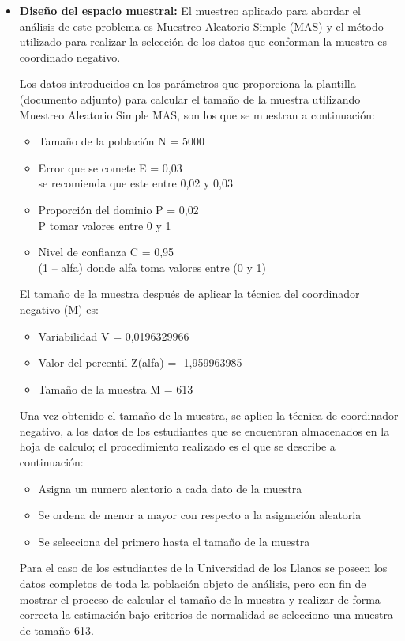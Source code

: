\begin{itemize}
  	\item \textbf {Diseño del espacio muestral:}
	El muestreo aplicado para abordar el análisis de este problema es Muestreo Aleatorio Simple (MAS) y el método utilizado para realizar la selección de los datos que conforman la muestra es coordinado negativo.
	
		
	\bigskip
	Los datos introducidos en los parámetros que proporciona la plantilla (documento adjunto) para calcular el tamaño de la muestra utilizando Muestreo Aleatorio Simple MAS, son los que se muestran a continuación:\\
	
	\begin{itemize}
		\item Tamaño de la población 	N = 5000	
		\item Error que se comete		E = 0,03	\\se recomienda que este entre 0,02 y 0,03
		\item Proporción del dominio	P = 0,02	\\P tomar valores entre 0 y 1
		\item Nivel de confianza		C = 0,95	\\(1 – alfa) donde alfa toma valores entre (0 y 1)
	\end{itemize}
	\bigskip
  	  	El tamaño de la muestra después de aplicar la técnica del coordinador negativo (M) es:
  	\bigskip  	
  	\begin{itemize}
  		\item Variabilidad			V = 0,0196329966
	  	\item Valor del percentil 	Z(alfa) = -1,959963985
		\item Tamaño de la muestra 	M = 613  	
  	\end{itemize}
  	\bigskip  	
  	Una vez obtenido el tamaño de la muestra, se aplico la técnica de coordinador negativo, a los datos de los estudiantes que se encuentran almacenados en la hoja de calculo; el procedimiento realizado es el que se describe a continuación:
  	\bigskip
  	\begin{itemize}
  		\item Asigna un numero aleatorio a cada dato de la muestra
		\item Se ordena de menor a mayor con respecto a la asignación aleatoria 
		\item Se selecciona del primero hasta el tamaño de la muestra  
  	 \end{itemize}
  	\bigskip  		
  	Para el caso de los estudiantes de la Universidad de los Llanos se poseen los datos completos de toda la población objeto de análisis, pero con fin de mostrar el proceso de calcular el tamaño de la muestra y realizar de forma correcta la estimación bajo criterios de normalidad se selecciono una muestra de tamaño 613.
  	

\end{itemize}
